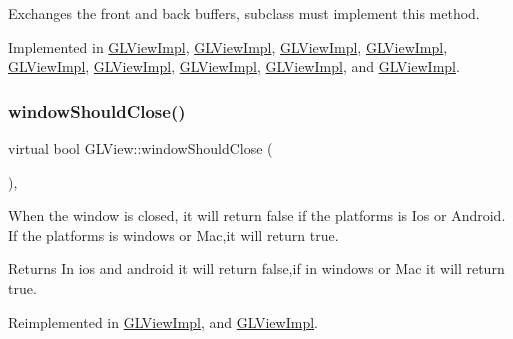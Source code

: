Exchanges the front and back buffers, subclass must implement this method. 

Implemented in \hyperlink{classGLViewImpl_afe7883d151fd7d92d19d3359dc33e8b9}{G\+L\+View\+Impl}, \hyperlink{classGLViewImpl_ab434675d26eb367ae74f9533c34d2ca7}{G\+L\+View\+Impl}, \hyperlink{classGLViewImpl_ab434675d26eb367ae74f9533c34d2ca7}{G\+L\+View\+Impl}, \hyperlink{classGLViewImpl_ab434675d26eb367ae74f9533c34d2ca7}{G\+L\+View\+Impl}, \hyperlink{classGLViewImpl_ab434675d26eb367ae74f9533c34d2ca7}{G\+L\+View\+Impl}, \hyperlink{classGLViewImpl_afe7883d151fd7d92d19d3359dc33e8b9}{G\+L\+View\+Impl}, \hyperlink{classGLViewImpl_a29bbe397ac0cd3793fa0815b34cd37aa}{G\+L\+View\+Impl}, \hyperlink{classGLViewImpl_a29bbe397ac0cd3793fa0815b34cd37aa}{G\+L\+View\+Impl}, and \hyperlink{classGLViewImpl_a29bbe397ac0cd3793fa0815b34cd37aa}{G\+L\+View\+Impl}.

\mbox{\label{classGLView_aa7a837484fd21d7c0a394e996963e84f}} 
\subsubsection{\texorpdfstring{window\+Should\+Close()}{windowShouldClose()}\hspace{0.1cm}{\footnotesize\ttfamily [1/2]}}
{\footnotesize\ttfamily virtual bool G\+L\+View\+::window\+Should\+Close (\begin{DoxyParamCaption}{ }\end{DoxyParamCaption})\hspace{0.3cm}{\ttfamily [inline]}, {\ttfamily [virtual]}}

When the window is closed, it will return false if the platforms is Ios or Android. If the platforms is windows or Mac,it will return true.

\begin{DoxyReturn}{Returns}
In ios and android it will return false,if in windows or Mac it will return true. 
\end{DoxyReturn}


Reimplemented in \hyperlink{classGLViewImpl_a0d0a12b4bfa3656c9b24ca8b141f7b1e}{G\+L\+View\+Impl}, and \hyperlink{classGLViewImpl_a0d0a12b4bfa3656c9b24ca8b141f7b1e}{G\+L\+View\+Impl}.

\mbox{\label{classGLView_aa7a837484fd21d7c0a394e996963e84f}} 
